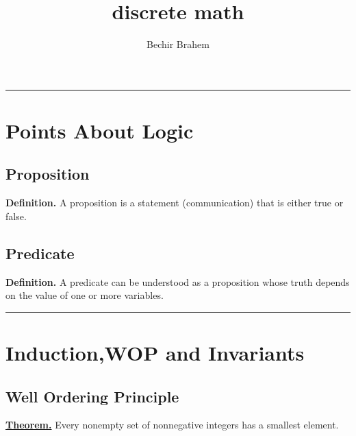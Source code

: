 \documentclass[10pt]{article}
\begin{document}
	
	\title{discrete math}
	\author{Bechir Brahem}
	\date{\vspace{-5ex}}
	\maketitle
	
	
	\par\noindent\rule{\textwidth}{3pt}
	\section{Points About Logic\ }
		\subsection{Proposition}
			\textbf{Definition. }A proposition is a statement (communication) that is either true or
			false. 
		\subsection{Predicate}
			\textbf{Definition.} A predicate can be understood as a proposition whose truth depends on the value
			of one or more variables. 
		\pagebreak
		
	\par\noindent\rule{\textwidth}{3pt}
	\section{Induction,WOP and Invariants\ }
		\subsection{Well Ordering Principle}
			\underline{\textbf{Theorem.}} Every nonempty set of nonnegative integers has a smallest element.
\end{document}
